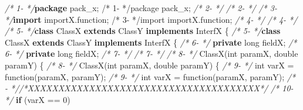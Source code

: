 \documentclass[
]{article}
\newenvironment{Shaded}{\begin{snugshade}}{\end{snugshade}}
\newcommand{\CommentTok}[1]{\textcolor[rgb]{0.56,0.35,0.01}{\textit{#1}}}
\newcommand{\DataTypeTok}[1]{\textcolor[rgb]{0.13,0.29,0.53}{#1}}
\newcommand{\DecValTok}[1]{\textcolor[rgb]{0.00,0.00,0.81}{#1}}
\newcommand{\FunctionTok}[1]{\textcolor[rgb]{0.00,0.00,0.00}{#1}}
\newcommand{\ImportTok}[1]{#1}
\newcommand{\KeywordTok}[1]{\textcolor[rgb]{0.13,0.29,0.53}{\textbf{#1}}}
\newcommand{\NormalTok}[1]{#1}
\begin{document}
\begin{landscape}
\begin{Shaded}
\begin{Highlighting}[]
\CommentTok{/*  1-                 */}\KeywordTok{package}\ImportTok{ pack_x;                                                /*  1-                 */package pack_x;}                                                
\CommentTok{/*  2-                 */}                                                               \CommentTok{/*  2-                 */}                                                               
\CommentTok{/*  3-                 */}\KeywordTok{import}\ImportTok{ importX.function;                                       /*  3-                 */import importX.function;}                                       
\CommentTok{/*  4-                 */}                                                               \CommentTok{/*  4-                 */}                                                               
\CommentTok{/*  5-                 */}\KeywordTok{class}\NormalTok{ ClassX }\KeywordTok{extends}\NormalTok{ ClassY }\KeywordTok{implements}\NormalTok{ InterfX \{               }\CommentTok{/*  5-                 */}\KeywordTok{class}\NormalTok{ ClassX }\KeywordTok{extends}\NormalTok{ ClassY }\KeywordTok{implements}\NormalTok{ InterfX \{               }
\CommentTok{/*  6-                 */}    \KeywordTok{private} \DataTypeTok{long}\NormalTok{ fieldX;                                       }\CommentTok{/*  6-                 */}    \KeywordTok{private} \DataTypeTok{long}\NormalTok{ fieldX;                                       }
\CommentTok{/*  7-                 */}                                                               \CommentTok{/*  7-                 */}                                                               
\CommentTok{/*  8-                 */}    \FunctionTok{ClassX}\NormalTok{(}\DataTypeTok{int}\NormalTok{ paramX, }\DataTypeTok{double}\NormalTok{ paramY) \{                                }\CommentTok{/*  8-                 */}    \FunctionTok{ClassX}\NormalTok{(}\DataTypeTok{int}\NormalTok{ paramX, }\DataTypeTok{double}\NormalTok{ paramY) \{                                }
\CommentTok{/*  9-                 */}        \DataTypeTok{int}\NormalTok{ varX = }\FunctionTok{function}\NormalTok{(paramX, paramY);                          }\CommentTok{/*  9-                 */}        \DataTypeTok{int}\NormalTok{ varX = }\FunctionTok{function}\NormalTok{(paramX, paramY);                           }
\CommentTok{/*   -                 *//*XXXXXXXXXXXXXXXXXXXXXXXXXXXXXXXXXXXXXX*/}                     \CommentTok{/* 10-                 */}        \KeywordTok{if}\NormalTok{ (varX == }\DecValTok{0}\NormalTok{)                                         }

\end{Highlighting}
\end{Shaded}
\end{landscape}
\end{document}
